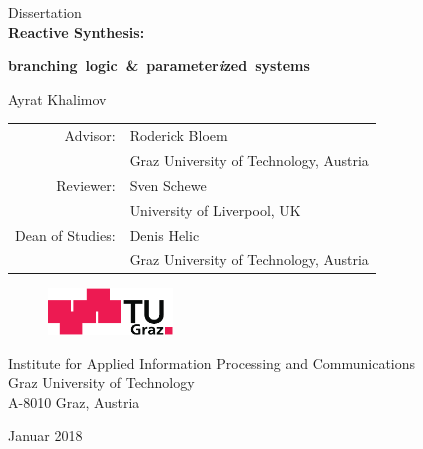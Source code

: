 
\begin{titlepage}
\begin{center}
\vspace*{2cm}
{\LARGE Dissertation}\\

\vspace{8mm}
{\Huge \bf Reactive Synthesis:}

\vspace{3mm}
{\bf \huge {branching~logic~{\LARGE\&}~parameter\emph{i}zed~systems}}
\vspace{8mm}

{\LARGE Ayrat Khalimov}

\vspace{1cm}

{\large
\begin{tabular}{rl}
Advisor:    & Roderick Bloem \\&Graz University of Technology, Austria\\[0.5ex]
Reviewer: & Sven Schewe \\&University of Liverpool, UK\\
Dean of Studies: & Denis Helic\\&Graz University of Technology, Austria\\
\end{tabular}}

\vfill

\begin{figure}[!ht]
\centerline{\includegraphics[width=3.3cm,keepaspectratio=true]{figures/title/tug}}
\end{figure}

{\large
Institute for Applied Information Processing and Communications\\
Graz University of Technology\\
A-8010 Graz, Austria\\
}

{\large Januar 2018}
\end{center}


\end{titlepage}

